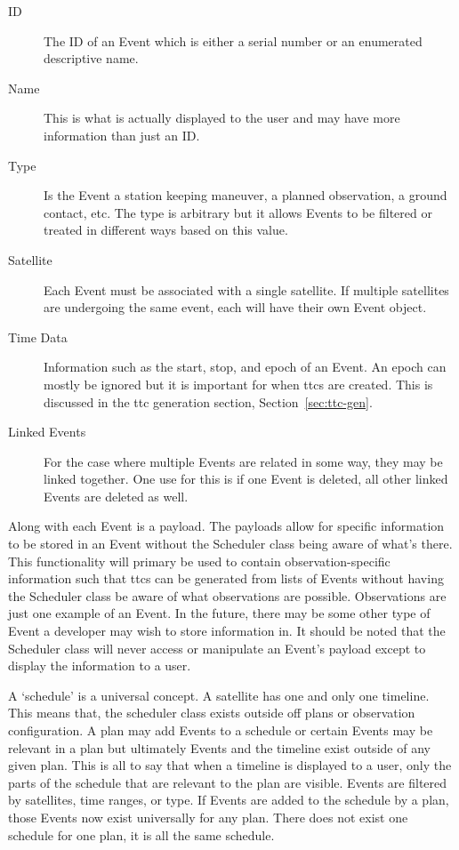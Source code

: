 \begin{description} 

    \item[ID] The ID of an Event which is either a serial number or an
	enumerated descriptive name.

    \item[Name] This is what is actually displayed to the user and may have
	more information than just an ID.

    \item[Type] Is the Event a station keeping maneuver, a planned observation,
	a ground contact, etc. The type is arbitrary but it allows Events to be
	filtered or treated in different ways based on this value.

    \item[Satellite] Each Event must be associated with a single satellite. If
	multiple satellites are undergoing the same event, each will have their
	own Event object.

    \item[Time Data] Information such as the start, stop, and epoch of an
	Event. An epoch can mostly be ignored but it is important for when
	\glspl{ttc} are created. This is discussed in the \gls{ttc} generation
	section, Section~\ref{sec:ttc-gen}.

    \item[Linked Events] For the case where multiple Events are related in some
	way, they may be linked together. One use for this is if one Event is
	deleted, all other linked Events are deleted as well.

\end{description} 

Along with each Event is a payload. The payloads allow for specific information
to be stored in an Event without the Scheduler class being aware of what's
there. This functionality will primary be used to contain observation-specific
information such that \glspl{ttc} can be generated from lists of Events without
having the Scheduler class be aware of what observations are possible.
Observations are just one example of an Event. In the future, there may be some
other type of Event a developer may wish to store information in.  It should be
noted that the Scheduler class will never access or manipulate an Event's
payload except to display the information to a user.

A `schedule' is a universal concept. A satellite has one and only one timeline.
This means that, the scheduler class exists outside off plans or observation
configuration. A plan may add Events to a schedule or certain Events may be
relevant in a plan but ultimately Events and the timeline exist outside of any
given plan. This is all to say that when a timeline is displayed to a user,
only the parts of the schedule that are relevant to the plan are visible.
Events are filtered by satellites, time ranges, or type. If Events are added to
the schedule by a plan, those Events now exist universally for any plan. There
does not exist one schedule for one plan, it is all the same schedule.

